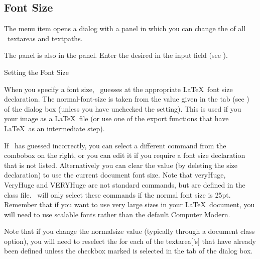 
\subsection{Font Size}\label{sec:fontsize}


The  menu item opens a dialog with a 
 panel in which you can change the
of all \selected\ \glspl{textarea} and \glspl{textpath}.


The  panel is also in the 
panel. Enter the desired  in the input field
(see ).

{}
{Setting the Font Size}

When you specify a font size, \FlowframTk\ guesses at the
appropriate \LaTeX\ font size declaration. The
\gls{normal-font-size} is taken from the value given in the
 tab (see ) of
the  dialog box (unless you have unchecked the
 setting). This is used if you
 your image as a \LaTeX\ file (or use one of the
export functions that have \LaTeX\ as an intermediate step).

If \FlowframTk\ has guessed incorrectly, you can select a different
command from the \gls{combobox} on the right, or you can edit it if
you require a font size declaration that is not listed.
Alternatively you can clear the value (by deleting the size
declaration) to use the current document font size.  Note that
\gls{veryHuge}, \gls{VeryHuge} and \gls{VERYHuge} are
not standard commands, but are defined in the 
class file.  \FlowframTk\ will only select these commands if the
normal font size is 25\gls{pt}. Remember that if you want to use
very large sizes in your \LaTeX\ document, you will need to use
scalable fonts rather than the default Computer Modern.

Note that if you change the \gls{normalsize} value (typically
through a document class option), you will
need to reselect the  for each of the \gls{textarea}['s]
that have already been defined unless the \gls*{checkbox} marked
 is selected in the
 tab of the  dialog box.

